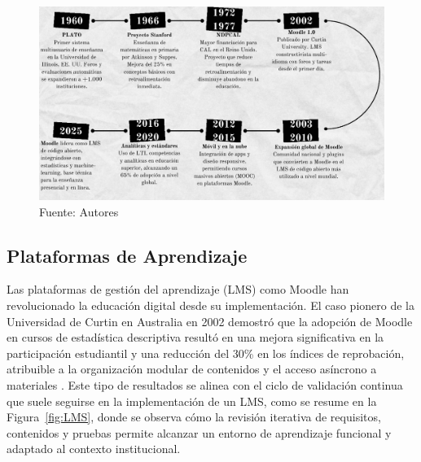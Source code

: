 \documentclass[letter,oneside,12pt,spanish]{report}
\begin{document}
\begin{figure}[ht]
	\centering
	\includegraphics[width=1\textwidth]{Figs/Linea del Tiempo.pdf}
	\label{fig:LineaTiempo}
	\\Fuente: Autores
\end{figure}

\subsection{Plataformas de Aprendizaje}
Las plataformas de gestión del aprendizaje (LMS) como Moodle han revolucionado la educación digital desde su implementación. El caso pionero de la Universidad de Curtin en Australia en 2002 demostró que la adopción de Moodle en cursos de estadística descriptiva resultó en una mejora significativa en la participación estudiantil y una reducción del 30\% en los índices de reprobación, atribuible a la organización modular de contenidos y el acceso asíncrono a materiales \parencite{Pacheco2025}. Este tipo de resultados se alinea con el ciclo de validación continua que suele seguirse en la implementación de un LMS, como se resume en la Figura~\ref{fig:LMS}, donde se observa cómo la revisión iterativa de requisitos, contenidos y pruebas permite alcanzar un entorno de aprendizaje funcional y adaptado al contexto institucional.
\end{document}
